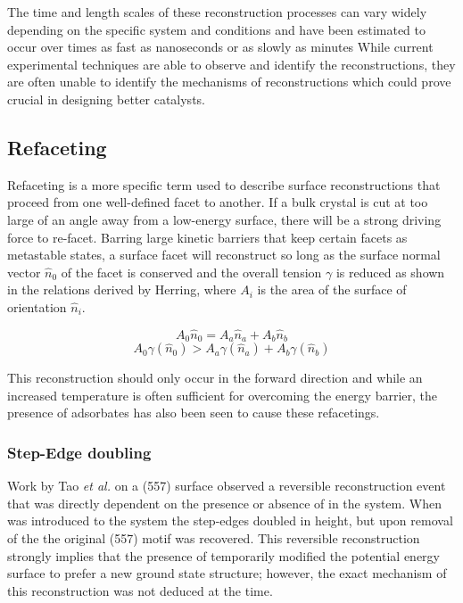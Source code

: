 The time and length scales of these reconstruction processes can vary widely
depending on the specific system and conditions and have been estimated to occur
over times as fast as nanoseconds or as slowly as minutes\citep{Tao:2010aa,
Eren:2016qt} While current experimental techniques are able to observe and
identify the reconstructions, they are often unable to identify the 
mechanisms of reconstructions which could prove crucial in designing better
catalysts.

\subsection{Refaceting}
Refaceting is a more specific term used to describe surface reconstructions
that proceed from one well-defined facet to another.  If a bulk crystal is cut
at too large of an angle away from a low-energy surface, there will be a strong
driving force to re-facet. Barring large kinetic barriers that keep certain
facets as metastable states, a surface facet will reconstruct so long as the
surface normal vector $\hat{n}_0$ of the facet is conserved and the overall
tension $\gamma$ is reduced as shown in the relations derived by
Herring\citep{Herring:1951ta}, where $A_i$ is the area of the surface of
orientation $\hat{n}_i$.

\begin{equation}
A_0\hat{n}_0 = A_a\hat{n}_a + A_b\hat{n}_b
\end{equation}
\begin{equation}
A_0\gamma(\hat{n}_0) > A_a\gamma(\hat{n}_a) + A_b\gamma(\hat{n}_b)
\end{equation}

This reconstruction should only occur in the forward direction and while an
increased temperature is often sufficient for overcoming the energy barrier,
the presence of adsorbates has also been seen to cause these
refacetings.\citep{Eren:2016qt, Williams:1994aa, Jeong:1999ev} 

\subsubsection{Step-Edge doubling}
Work by Tao {\it et al.} on a  (557) surface observed a reversible
reconstruction event that was directly dependent on the presence or absence of
 in the system.\citep{Tao:2011aa} When  was introduced to the
system the step-edges doubled in height, but upon removal of the  the original
(557) motif was recovered. This reversible reconstruction strongly implies that
the presence of  temporarily modified the potential energy surface to
prefer a new ground state structure; however, the exact mechanism of this
reconstruction was not deduced at the time. 

